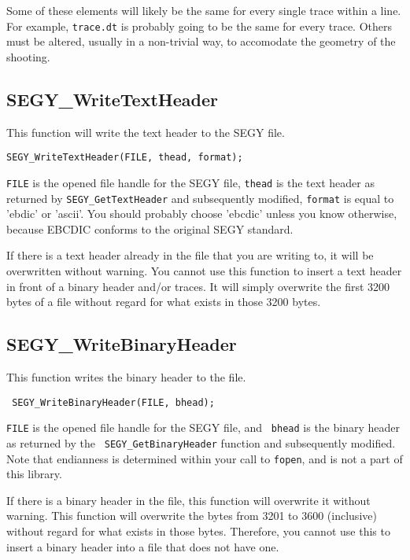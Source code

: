 \documentclass[10pt]{article}
\newcommand{\segy}{{\scriptsize SEGY}\xspace}
\newcommand{\ebcdic}{{\scriptsize EBCDIC}\xspace}
\begin{document}
Some of these elements will likely be the same for every single trace
within a line. For example, {\tt trace.dt} is probably going to be the
same for every trace. Others must be altered, usually in a non-trivial
way, to accomodate the geometry of the shooting.


\subsection{SEGY\_WriteTextHeader}

This function will write the text header to the \segy file.

\begin{verbatim}
SEGY_WriteTextHeader(FILE, thead, format);
\end{verbatim}

{\tt FILE} is the opened file handle for the \segy file, {\tt thead}
is the text header as returned by {\tt SEGY\_GetTextHeader} and
subsequently modified, {\tt format} is equal to 'ebdic' or 'ascii'.
You should probably choose 'ebcdic' unless you know otherwise, because
\ebcdic conforms to the original \segy standard.

If there is a text header already in the file that you are writing to,
it will be overwritten without warning. You cannot use this function
to insert a text header in front of a binary header and/or traces. It
will simply overwrite the first 3200 bytes of a file without regard
for what exists in those 3200 bytes.

\subsection{SEGY\_WriteBinaryHeader}

This function writes the binary header to the file.

\begin{verbatim}
 SEGY_WriteBinaryHeader(FILE, bhead);
\end{verbatim}

{\tt FILE} is the opened file handle for the \segy file, and {\tt
  bhead} is the binary header as returned by the {\tt
  SEGY\_GetBinaryHeader} function and subsequently modified. Note that
endianness is determined within your call to {\tt fopen}, and is not a
part of this library.

If there is a binary header in the file, this function will overwrite
it without warning. This function will overwrite the bytes from 3201
to 3600 (inclusive) without regard for what exists in those
bytes. Therefore, you cannot use this to insert a binary header into a
file that does not have one. 
\end{document}
